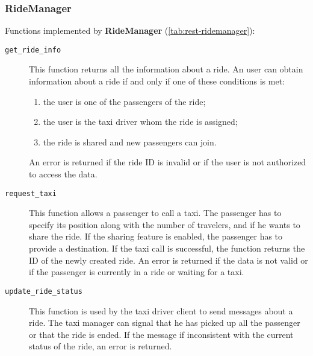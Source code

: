 \subsubsection{RideManager}
Functions implemented by \textbf{RideManager} (\autoref{tab:rest-ridemanager}):
\begin{description}
    \item[\texttt{get\_ride\_info}] This function returns all the information about a ride. An user can obtain information about a ride if and only if one of these conditions is met:
    \begin{enumerate}
        \item the user is one of the passengers of the ride;
        \item the user is the taxi driver whom the ride is assigned;
        \item the ride is shared and new passengers can join.
    \end{enumerate}
    An error is returned if the ride ID is invalid or if the user is not authorized to access the data.

    \item[\texttt{request\_taxi}] This function allows a passenger to call a taxi. The passenger has to specify its position along with the number of travelers, and if he wants to share the ride. If the sharing feature is enabled, the passenger has to provide a destination. If the taxi call is successful, the function returns the ID of the newly created ride. An error is returned if the data is not valid or if the passenger is currently in a ride or waiting for a taxi.

    \item[\texttt{update\_ride\_status}] This function is used by the taxi driver client to send messages about a ride. The taxi manager can signal that he has picked up all the passenger or that the ride is ended. If the message if inconsistent with the current status of the ride, an error is returned.
\end{description}


